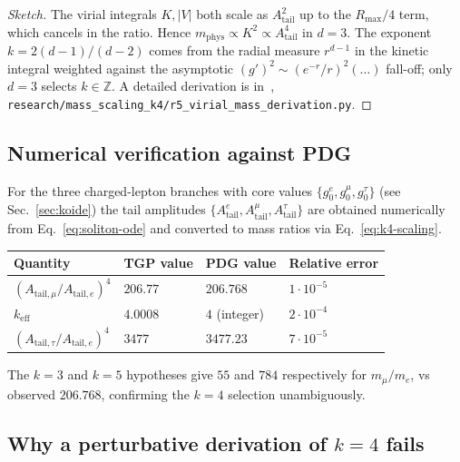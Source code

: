 \documentclass[11pt,a4paper]{article}
\newcommand{\Atail}{A_{\mathrm{tail}}}
\newcommand{\mphys}{m_{\mathrm{phys}}}
\begin{document}
\begin{proof}[Sketch]
The virial integrals $K,|V|$ both scale as $\Atail^{2}$ up to the
$R_{\max}/4$ term, which cancels in the ratio. Hence
$\mphys\propto K^{2}\propto \Atail^{4}$ in $d=3$. The exponent
$k=2(d-1)/(d-2)$ comes from the radial measure $r^{d-1}$ in the
kinetic integral weighted against the asymptotic $(g')^{2}\sim
(e^{-r}/r)^{2}(\ldots)$ fall-off; only $d=3$ selects $k\in\mathbb{Z}$.
A detailed derivation is in~\cite{TGP-repo},
\verb|research/mass_scaling_k4/r5_virial_mass_derivation.py|.
\end{proof}

\subsection{Numerical verification against PDG}

For the three charged-lepton branches with core values
$\{g_{0}^{e},g_{0}^{\mu},g_{0}^{\tau}\}$ (see Sec.~\ref{sec:koide}) the
tail amplitudes $\{\Atail^{e},\Atail^{\mu},\Atail^{\tau}\}$ are
obtained numerically from Eq.~\eqref{eq:soliton-ode} and converted to
mass ratios via Eq.~\eqref{eq:k4-scaling}.

\begin{center}\small
{}\label{tab:mass-ratios}
\begin{tabular}{@{}llll@{}}
\toprule
Quantity & TGP value & PDG value & Relative error\\
\midrule
$(A_{\mathrm{tail},\mu}/A_{\mathrm{tail},e})^{4}$ & $206.77$ & $206.768$ & $1\cdot 10^{-5}$\\
$k_{\mathrm{eff}}$                & $4.0008$ & $4$ (integer) & $2\cdot 10^{-4}$\\
$(A_{\mathrm{tail},\tau}/A_{\mathrm{tail},e})^{4}$ & $3477$   & $3477.23$ & $7\cdot 10^{-5}$\\
\bottomrule
\end{tabular}
\end{center}

The $k=3$ and $k=5$ hypotheses give $55$ and $784$ respectively for
$m_{\mu}/m_{e}$, vs observed $206.768$, confirming the $k=4$ selection
unambiguously.

\subsection{Why a perturbative derivation of \texorpdfstring{$k=4$}{k=4} fails}
\end{document}
